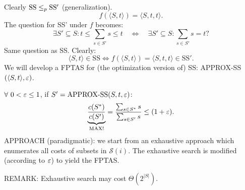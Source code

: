 Clearly $\mathrm{SS}\leq_p\mathrm{SS'}$ (generalization).
\[f(\langle S,t\rangle)=\langle S,t,t\rangle.\]
The question for SS' under $f$ becomes:
\[\exists S'\subseteq S:t\leq\sum_{s\in S'}s\leq t
\quad\Longleftrightarrow\quad\exists S'\subseteq S:\sum_{s\in S'}s=t\text{?}\]
Same question as SS. Clearly:
\[\langle S,t\rangle\in\mathrm{SS}\Longleftrightarrow
f(\langle S,t\rangle)=\langle S,t,t\rangle\in\mathrm{SS'}.\]
We will develop a FPTAS for (the optimization version of) SS:
APPROX-SS$(\langle S,t\rangle,\varepsilon)$.

$\forall\ 0<\varepsilon\leq1$, if $S'=\mathrm{APPROX\text{-}SS}(S,t,\varepsilon)$:
\[\underbrace{\frac{c(S^*)}{c(S')}}_{\text{MAX!}}
=\frac{\sum_{s\in S^*}s}{\sum_{s\in S'}s}\leq(1+\varepsilon).\]
APPROACH (paradigmatic): we start from an exhaustive approach which enumerates all costs of subsets in $\mathcal S(i)$. The exhaustive search is modified (according to $\varepsilon$) to yield the FPTAS.

REMARK: Exhaustive search may cost $\Theta(2^{|S|})$.

